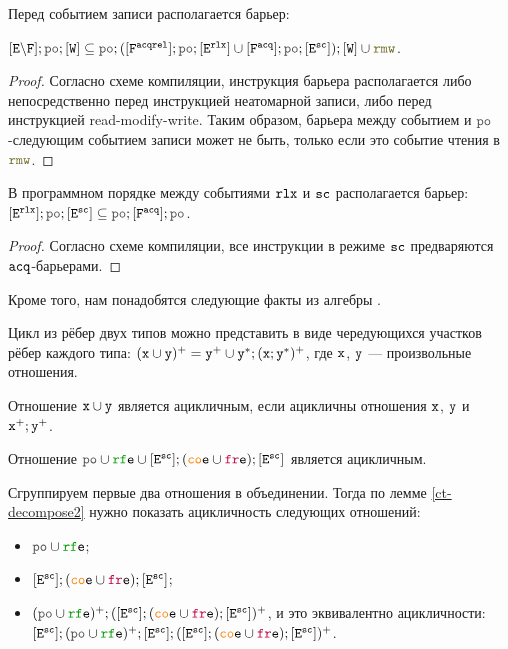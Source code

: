 \begin{lemma}  \label{sb-w-sync}
  Перед событием записи располагается барьер:

  $[\lE \backslash \lF] ; \lPO ; [\lW] \subseteq \lPO ; ([\Far] ; \lPO ; [\lE^{\rlx}] \cup [\Fa] ; \lPO ; [\lE^{\sco}]) ; [\lW] \cup \lRMW$.
\end{lemma}
\begin{proof}
  Согласно схеме компиляции, инструкция барьера располагается либо непосредственно перед инструкцией неатомарной записи, либо перед инструкцией read-modify-write. Таким образом, барьера между событием и $\lPO$-следующим событием записи может не быть, только если это событие чтения в $\lRMW$.
\end{proof}

\begin{lemma}  \label{sb-sc-sync}
  В программном порядке между событиями $\mathtt{rlx}$ и ${\mathtt{sc}}$ располагается барьер:  $[\lE^{\rlx}] ; \lPO ; [\lE^{\sco}] \subseteq \lPO ; [\Fa] ; \lPO$.
\end{lemma}
\begin{proof}
  Согласно схеме компиляции, все инструкции в режиме ${\mathtt{sc}}$ предваряются ${\mathtt{acq}}$-барьерами. 
\end{proof}

Кроме того, нам понадобятся следующие факты из алгебры \cite{hahn-repo}.

\begin{lemma} \label{ct-decompose1}
  Цикл из рёбер двух типов можно представить в виде чередующихся участков рёбер каждого типа: $(\mathtt{x} \cup \mathtt{y})^{+} = \mathtt{y}^{+} \cup \mathtt{y}^{*} ; (\mathtt{x} ; \mathtt{y}^{*})^{+}$, где $\mathtt{x}$, $\mathtt{y}$ --- произвольные отношения.
\end{lemma}

\begin{lemma} \label{ct-decompose2}
  Отношение $\mathtt{x}\cup \mathtt{y}$ является ацикличным, если ацикличны отношения $\mathtt{x}$, $\mathtt{y}$ и $\mathtt{x}^{+};\mathtt{y}^{+}$.
\end{lemma}

\begin{theorem} \label{corr-causality-thm}
  Отношение $\lPO \cup \lRFE \cup [\lE^{\sco}] ; (\lCOE \cup \lFRE) ; [\lE^{\sco}]$ является ацикличным. 
\end{theorem}

Сгруппируем первые два отношения в объединении. Тогда по лемме \ref{ct-decompose2} нужно показать ацикличность следующих отношений:
\begin{itemize}
\item $\lPO \cup \lRFE$;
\item $[\lE^{\sco}] ; (\lCOE \cup \lFRE) ; [\lE^{\sco}]$;
\item $(\lPO \cup \lRFE)^{+} ; ([\lE^{\sco}] ; (\lCOE \cup \lFRE) ; [\lE^{\sco}])^{+}$, и это эквивалентно ацикличности:  $[\lE^{\sco}];(\lPO \cup \lRFE)^{+} ; [\lE^{\sco}] ; ([\lE^{\sco}] ; (\lCOE \cup \lFRE) ; [\lE^{\sco}])^{+}$. 
\end{itemize}

